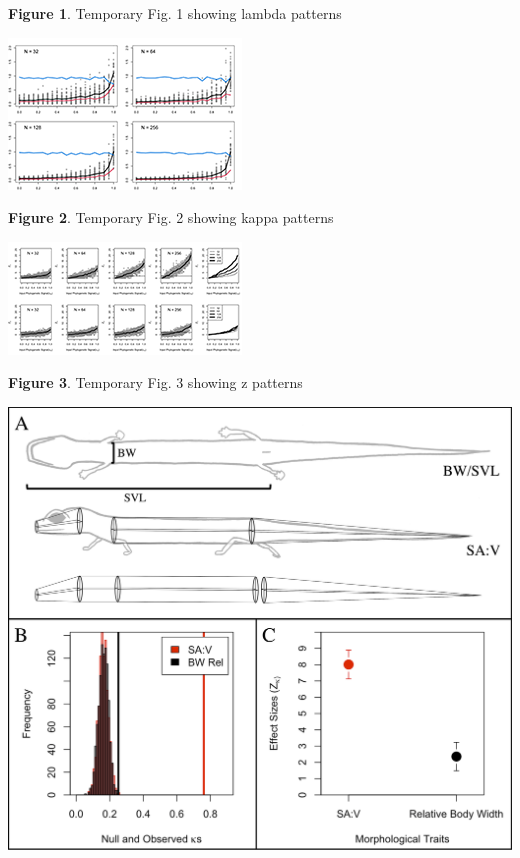 \documentclass[
]{article}
\begin{document}
\singlespacing \textbf{Figure 1}. Temporary Fig. 1 showing lambda
patterns

\newpage

\includegraphics[width=0.95\linewidth]{new.fig.2.temp}

\singlespacing \textbf{Figure 2}. Temporary Fig. 2 showing kappa
patterns

\newpage

\includegraphics[width=0.95\linewidth]{new.fig.3.temp}

\singlespacing \textbf{Figure 3}. Temporary Fig. 3 showing z patterns

\newpage

\includegraphics[width=0.95\linewidth]{new.fig.4}
\end{document}
